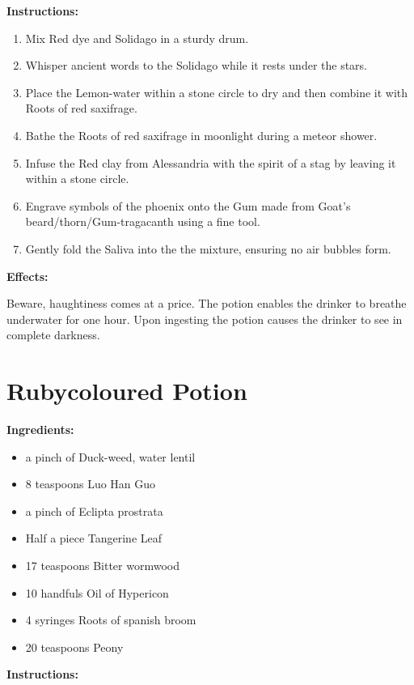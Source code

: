 \documentclass{article}
\begin{document}
\textbf{Instructions:}

\begin{enumerate}
  \item Mix Red dye and Solidago in a sturdy drum.
  \item Whisper ancient words to the Solidago while it rests under the stars.
  \item Place the Lemon-water within a stone circle to dry and then combine it with Roots of red saxifrage.
  \item Bathe the Roots of red saxifrage in moonlight during a meteor shower.
  \item Infuse the Red clay from Alessandria with the spirit of a stag by leaving it within a stone circle.
  \item Engrave symbols of the phoenix onto the Gum made from Goat's beard/thorn/Gum-tragacanth using a fine tool.
  \item Gently fold the Saliva into the the mixture, ensuring no air bubbles form.
\end{enumerate}

\textbf{Effects:}

Beware, haughtiness comes at a price. The potion enables the drinker to breathe underwater for one hour. Upon ingesting the potion causes the drinker to see in complete darkness.

\newpage
\section*{Rubycoloured Potion}

\textbf{Ingredients:}

\begin{itemize}
  \item a pinch of Duck-weed, water lentil
  \item 8 teaspoons Luo Han Guo
  \item a pinch of Eclipta prostrata
  \item Half a piece Tangerine Leaf
  \item 17 teaspoons Bitter wormwood
  \item 10 handfuls Oil of Hypericon
  \item 4 syringes Roots of spanish broom
  \item 20 teaspoons Peony
\end{itemize}

\textbf{Instructions:}
\end{document}
